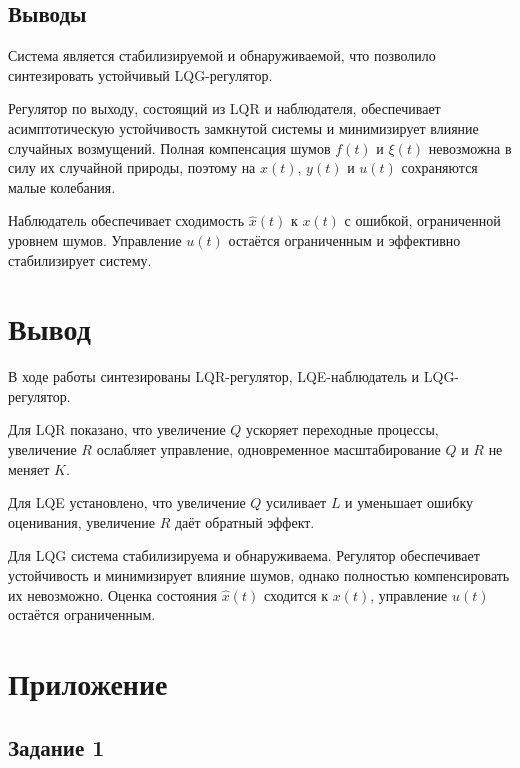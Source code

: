 \documentclass[a4paper,12pt]{article}
\begin{document}
\subsection{Выводы}

Система является стабилизируемой и обнаруживаемой, что позволило синтезировать устойчивый LQG-регулятор.

Регулятор по выходу, состоящий из LQR и наблюдателя, обеспечивает асимптотическую устойчивость замкнутой системы и минимизирует влияние случайных возмущений. Полная компенсация шумов $f(t)$ и $\xi(t)$ невозможна в силу их случайной природы, поэтому на $x(t)$, $y(t)$ и $u(t)$ сохраняются малые колебания.

Наблюдатель обеспечивает сходимость $\hat{x}(t)$ к $x(t)$ с ошибкой, ограниченной уровнем шумов. Управление $u(t)$ остаётся ограниченным и эффективно стабилизирует систему.


	
\newpage

\section{Вывод}

В ходе работы синтезированы LQR-регулятор, LQE-наблюдатель и LQG-регулятор.

Для LQR показано, что увеличение $Q$ ускоряет переходные процессы, увеличение $R$ ослабляет управление, одновременное масштабирование $Q$ и $R$ не меняет $K$.

Для LQE установлено, что увеличение $Q$ усиливает $L$ и уменьшает ошибку оценивания, увеличение $R$ даёт обратный эффект.

Для LQG система стабилизируема и обнаруживаема. Регулятор обеспечивает устойчивость и минимизирует влияние шумов, однако полностью компенсировать их невозможно. Оценка состояния $\hat{x}(t)$ сходится к $x(t)$, управление $u(t)$ остаётся ограниченным.	
	
	
	
	
	
	
	
	
	
\newpage
\section{Приложение}

\subsection*{Задание 1}
\end{document}

